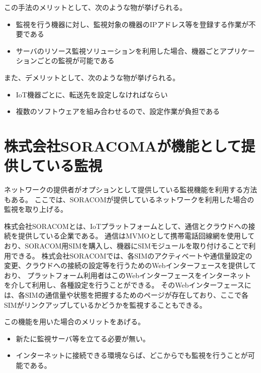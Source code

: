	この手法のメリットとして、次のような物が挙げられる。
	\begin{itemize}
		\item 監視を行う機器に対し、監視対象の機器のIPアドレス等を登録する作業が不要である
		\item サーバのリソース監視ソリューションを利用した場合、機器ごとアプリケーションごとの監視が可能である
	\end{itemize}
	
	また、デメリットとして、次のような物が挙げられる。
	\begin{itemize}
		\item IoT機器ごとに、転送先を設定しなければならい
		\item 複数のソフトウェアを組み合わせるので、設定作業が負担である
	\end{itemize}

\begin{comment}
	この形だと，機器監視サーバが監視対象のIPアドレスを覚えておく必要がなくなるため，監視対象が接続されるネットワークが切り替わった場合でも，追跡が可能である．
	ところが，エージェントプログラムの導入には，技術スキルと時間が必要である．
	また，サーバーの構築・設定も必要となる．
\end{comment}

\section{株式会社SORACOMAが機能として提供している監視} %
	ネットワークの提供者がオプションとして提供している監視機能を利用する方法もある。
	ここでは、SORACOMが提供しているネットワークを利用した場合の監視を取り上げる。
	
	株式会社SORACOMとは、IoTプラットフォームとして、通信とクラウドへの接続を提供している企業である。
	通信はMVMOとして携帯電話回線網を使用しており、SORACOM用SIMを購入し、機器にSIMモジュールを取り付けることで利用できる。
	株式会社SORACOMでは、各SIMのアクティベートや通信量設定の変更、クラウドへの接続の設定等を行うためのWebインターフェースを提供しており、
	プラットフォーム利用者はこのWebインターフェースをインターネットを介して利用し、各種設定を行うことができる。
	そのWebインターフェースには、各SIMの通信量や状態を把握するためのページが存在しており、ここで各SIMがリンクアップしているかどうかを監視することもできる。

	この機能を用いた場合のメリットをあげる。
	\begin{itemize}
		\item 新たに監視サーバ等を立てる必要が無い。
		\item インターネットに接続できる環境ならば、どこからでも監視を行うことが可能である。
	\end{itemize}

